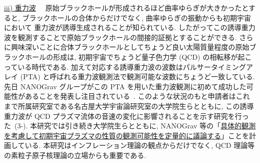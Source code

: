 \documentclass[11pt,a4paper,uplatex,dvipdfmx]{ujarticle} 		%
\newcommand{\研究課題名}{確率解析・原始ブラックホール・重力波観測から迫るインフレーション}
\newcommand{\研究機関名}{名古屋大学}
\newcommand{\研究代表者氏名}{多田祐一郎}
\newcommand{\研究期間の最終元号年度}{6}  %
\newcommand{\GW}[1]{\noindent\colorbox{GW}{\ul{iii) #1}}~~}
\begin{document}
\medskip


\GW{重力波}
原始ブラックホールが形成されるほど曲率ゆらぎが大きかったとすると, ブラックホールの合体からだけでなく, 曲率ゆらぎの振動からも初期宇宙において
重力波が誘導生成されることが知られている. したがってこの誘導重力波を観測することで原始ブラックホールの間接的証拠とすることができる.
さらに興味深いことに合体ブラックホールとしてちょうど良い太陽質量程度の原始ブラックホールの形成は, 
初期宇宙でちょうど量子色力学 (QCD) の相転移が起こっている時代である.
加えて対応する誘導重力波の波数はパルサータイミングアレイ (PTA) と呼ばれる重力波観測法で観測可能な波数にちょうど一致している.
先日 NANOGrav グループがこの PTA を用いた重力波観測に初めて成功した可能性があることを発表し注目されている~\cite{Arzoumanian:2020vkk}.
このような状況のもと申請者はこれまで所属研究室である名古屋大学宇宙論研究室の大学院生らとともに,
この誘導重力波が QCD プラズマ流体の音速の変化に影響されることを示す研究を行った~(3-\cite{Abe:2020sqb}).
本研究では引き続き大学院生らとともに, NANOGrav 等の「\ul{具体的観測を考慮して初期宇宙プラズマの性質の観測可能性を定量的に議論する}」ことを計画している.
本研究はインフレーション理論の観点からだけでなく, QCD 理論等の素粒子原子核理論の立場からも重要である.

\bigskip
\end{document}
